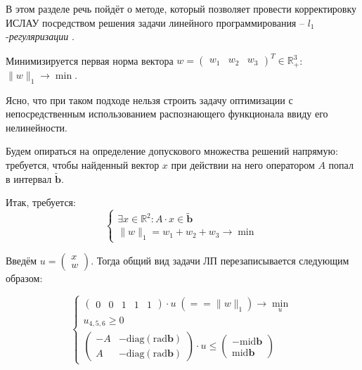 В этом разделе речь пойдёт о методе, который позволяет провести корректировку ИСЛАУ посредством решения задачи линейного программирования -- $l_1$-\textit{регуляризации} \cite{intv}.

Минимизируется первая норма вектора 
$w = 
\begin{pmatrix}
w_1 & w_2 & w_3
\end{pmatrix}^T \in \mathbb{R}_+^3$: $\|w\|_1 \rightarrow \min$.

Ясно, что при таком подходе нельзя строить задачу оптимизации с непосредственным использованием распознающего функционала ввиду его нелинейности. 

Будем опираться на определение допускового множества решений напрямую: требуется, чтобы найденный вектор $x$ при действии на него оператором $A$ попал в интервал $\tilde{\mathbf{b}}$.

Итак, требуется:
\begin{equation}
\begin{cases}
	\exists x \in \mathbb{R}^2: A \cdot x \in \tilde{\mathbf{b}} \\
	\|w\|_1 = w_1 + w_2 + w_3 \rightarrow \min
\end{cases}
\end{equation}

Введём 
$u=
\begin{pmatrix}
x \\ w
\end{pmatrix}$.
Тогда общий вид задачи ЛП перезаписывается следующим образом: 

\begin{equation}
\begin{cases}
\begin{pmatrix}
0 & 0 & 1 & 1 & 1
\end{pmatrix} \cdot u \; (== \|w\|_1) \rightarrow \underset{u}{\min} \\
u_{4,5,6} \geq 0 \\
\begin{pmatrix}
-A & -\textrm{diag}(\textrm{rad} \mathbf{b}) \\
 A & -\textrm{diag}(\textrm{rad} \mathbf{b})
\end{pmatrix}
\cdot
u
\leq 
\begin{pmatrix}
-\textrm{mid} \mathbf{b} \\
\textrm{mid} \mathbf{b}
\end{pmatrix}
\end{cases}
\end{equation}

